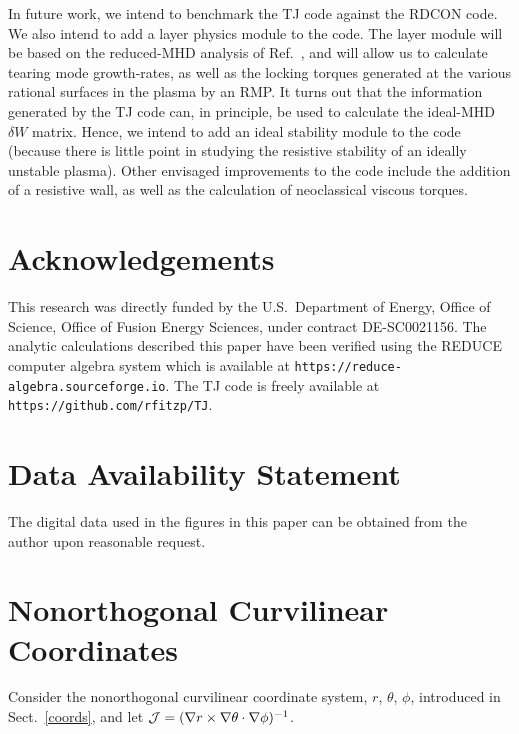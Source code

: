 \documentclass[12pt,prb,aps]{revtex4-1}
\begin{document}
In future work, we intend to benchmark the TJ code against the RDCON code. We also intend to add a layer physics module to the code. The
layer module will be based on
the reduced-MHD analysis of Ref.~, and will allow us to calculate tearing mode growth-rates, as well as the locking torques generated at the various rational
surfaces in the plasma by an RMP. It turns out that the information generated by the TJ code can, in principle,  be used to calculate the ideal-MHD $\delta W$
matrix.\cite{gs1} Hence, we intend to add an ideal stability module to the code (because there is little point in studying the resistive stability of
an ideally unstable plasma). Other envisaged improvements to the code include the addition of a resistive wall, as well as the
calculation of neoclassical viscous torques. 

\section*{Acknowledgements}
This research was directly funded by the U.S.\ Department of Energy, Office of Science, Office of Fusion Energy Sciences, under  contract DE-SC0021156. 
The analytic calculations  described  this paper have been verified using the {\sc REDUCE} computer algebra system which is available at {\tt https://reduce-algebra.sourceforge.io}. The TJ code is freely 
available at {\tt https://github.com/rfitzp/TJ}.

\section*{Data Availability Statement}
The digital data used in the figures in this paper can be obtained from the author upon reasonable request.

\appendix
\section{Nonorthogonal Curvilinear Coordinates}\label{s2}
Consider the nonorthogonal curvilinear coordinate system, $r$, $\theta$, $\phi$,  introduced in Sect.~\ref{coords}, and let
${\cal J}=  (\nabla r\times \nabla\theta\cdot\nabla\phi)^{-1}$.
\end{document}
